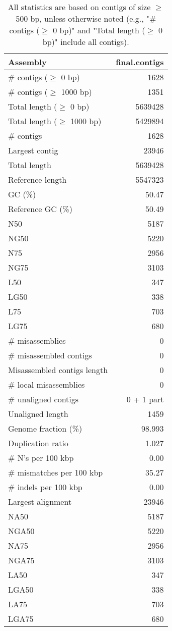 \documentclass[12pt,a4paper]{article}
\begin{document}
\begin{table}[ht]
\begin{center}
\caption{All statistics are based on contigs of size $\geq$ 500 bp, unless otherwise noted (e.g., "\# contigs ($\geq$ 0 bp)" and "Total length ($\geq$ 0 bp)" include all contigs).}
\begin{tabular}{|l*{1}{|r}|}
\hline
Assembly & final.contigs \\ \hline
\# contigs ($\geq$ 0 bp) & 1628 \\ \hline
\# contigs ($\geq$ 1000 bp) & 1351 \\ \hline
Total length ($\geq$ 0 bp) & 5639428 \\ \hline
Total length ($\geq$ 1000 bp) & 5429894 \\ \hline
\# contigs & 1628 \\ \hline
Largest contig & 23946 \\ \hline
Total length & 5639428 \\ \hline
Reference length & 5547323 \\ \hline
GC (\%) & 50.47 \\ \hline
Reference GC (\%) & 50.49 \\ \hline
N50 & 5187 \\ \hline
NG50 & 5220 \\ \hline
N75 & 2956 \\ \hline
NG75 & 3103 \\ \hline
L50 & 347 \\ \hline
LG50 & 338 \\ \hline
L75 & 703 \\ \hline
LG75 & 680 \\ \hline
\# misassemblies & 0 \\ \hline
\# misassembled contigs & 0 \\ \hline
Misassembled contigs length & 0 \\ \hline
\# local misassemblies & 0 \\ \hline
\# unaligned contigs & 0 + 1 part \\ \hline
Unaligned length & 1459 \\ \hline
Genome fraction (\%) & 98.993 \\ \hline
Duplication ratio & 1.027 \\ \hline
\# N's per 100 kbp & 0.00 \\ \hline
\# mismatches per 100 kbp & 35.27 \\ \hline
\# indels per 100 kbp & 0.00 \\ \hline
Largest alignment & 23946 \\ \hline
NA50 & 5187 \\ \hline
NGA50 & 5220 \\ \hline
NA75 & 2956 \\ \hline
NGA75 & 3103 \\ \hline
LA50 & 347 \\ \hline
LGA50 & 338 \\ \hline
LA75 & 703 \\ \hline
LGA75 & 680 \\ \hline
\end{tabular}
\end{center}
\end{table}
\end{document}
